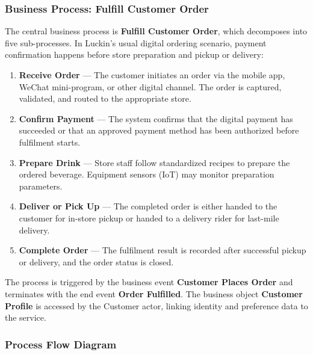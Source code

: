 \documentclass[12pt,a4paper]{article}
\begin{document}
\subsubsection{Business Process: Fulfill Customer Order}

The central business process is \textbf{Fulfill Customer Order}, which decomposes into five sub-processes. In Luckin's usual digital ordering scenario, payment confirmation happens before store preparation and pickup or delivery:

\begin{enumerate}[leftmargin=1.3em, nosep]
  \item \textbf{Receive Order} --- The customer initiates an order via the mobile app, WeChat mini-program, or other digital channel. The order is captured, validated, and routed to the appropriate store.
  \item \textbf{Confirm Payment} --- The system confirms that the digital payment has succeeded or that an approved payment method has been authorized before fulfilment starts.
  \item \textbf{Prepare Drink} --- Store staff follow standardized recipes to prepare the ordered beverage. Equipment sensors (IoT) may monitor preparation parameters.
  \item \textbf{Deliver or Pick Up} --- The completed order is either handed to the customer for in-store pickup or handed to a delivery rider for last-mile delivery.
  \item \textbf{Complete Order} --- The fulfilment result is recorded after successful pickup or delivery, and the order status is closed.
\end{enumerate}

The process is triggered by the business event \textbf{Customer Places Order} and terminates with the end event \textbf{Order Fulfilled}. The business object \textbf{Customer Profile} is accessed by the Customer actor, linking identity and preference data to the service.

\subsubsection{Process Flow Diagram}
\end{document}
